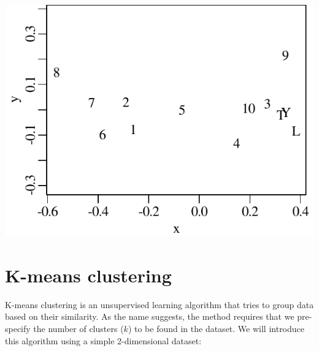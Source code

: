 \noindent\begin{minipage}[t][][b]{.4\textwidth}
  \includegraphics[width=\textwidth]{../figures/DZmds.pdf}\medskip
\end{minipage}
\begin{minipage}[t][][t]{.6\textwidth}
  \label{fig:DZmds}
\end{minipage}

\section{K-means clustering}
\label{sec:kmeans}

K-means clustering is an unsupervised learning algorithm that tries to
group data based on their similarity. As the name suggests, the method
requires that we pre-specify the number of clusters ($k$) to be found
in the dataset. We will introduce this algorithm using a simple
2-dimensional dataset:

